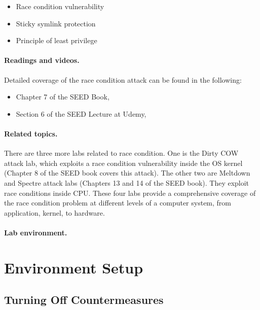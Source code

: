 \begin{itemize}[noitemsep]
\item Race condition vulnerability
\item Sticky symlink protection
\item Principle of least privilege
\end{itemize}




\paragraph{Readings and videos.}
Detailed coverage of the race condition attack can be found in the following:

\begin{itemize}
\item Chapter 7 of the SEED Book, \seedbook
\item Section 6 of the SEED Lecture at Udemy, \seedcsvideo
\end{itemize}


\paragraph{Related topics.}
There are three more labs related to race condition. One 
is the Dirty COW attack lab, which exploits a race condition vulnerability
inside the OS kernel (Chapter 8 of the SEED book covers this attack).
The other two are Meltdown and Spectre attack labs (Chapters 13 and 14 
of the SEED book). They exploit 
race conditions inside CPU. These four labs provide 
a comprehensive coverage of the race condition problem at 
different levels of a computer system, from application, kernel, 
to hardware. 


\paragraph{Lab environment.} \seedenvironmentC


\section{Environment Setup}

\subsection{Turning Off Countermeasures}


